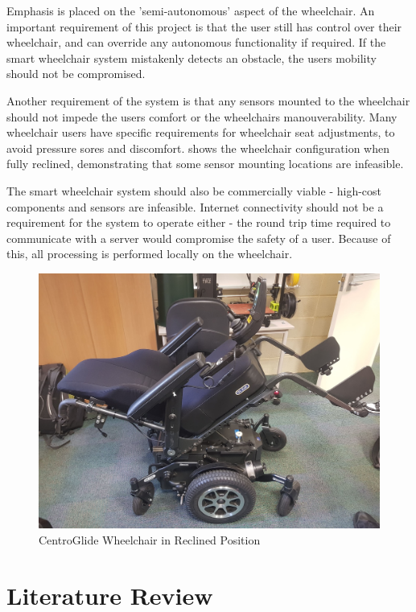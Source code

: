 \documentclass[12pt]{article}
\begin{document}
Emphasis is placed on the 'semi-autonomous' aspect of the wheelchair.
An important requirement of this project is that the user still
has control over their wheelchair, and can override any autonomous functionality
if required. If the smart wheelchair system mistakenly detects an obstacle,
the users mobility should not be compromised.

Another requirement of the system is that any sensors mounted to the wheelchair
should not impede the users comfort or the wheelchairs manouverability.
Many wheelchair users have specific requirements for wheelchair seat adjustments,
to avoid pressure sores and discomfort.  shows the
wheelchair configuration when fully reclined, demonstrating that some sensor mounting locations
are infeasible.

The smart wheelchair system should also be commercially viable - high-cost
components and sensors are infeasible. Internet connectivity should not be a requirement
for the system to operate either - the round trip time required to communicate with a server
would compromise the safety of a user. Because of this, all processing is performed locally
on the wheelchair.

\begin{figure}[H]
    \centering
    \includegraphics[width=0.35\linewidth]{images/wheelchair_reclined.jpg}
    \caption{CentroGlide Wheelchair in Reclined Position}
    \label{fig:wheelchair_reclined}
\end{figure}

\pagebreak





\section{Literature Review}
\end{document}
